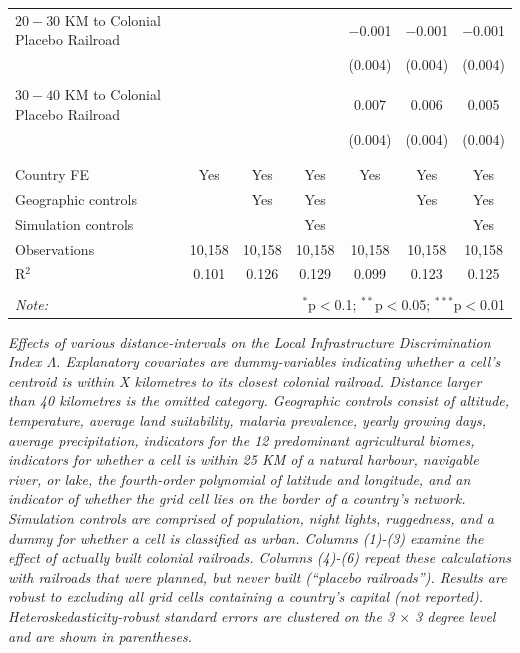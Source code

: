 \documentclass[11pt, oneside]{article}   	%
\newcommand{\mysubcaption}[1]{
\justify
\begin{spacing}{0.7}
\textit{\footnotesize #1}
\end{spacing}}
\begin{document}
\begin{table}[!ph]
{\begin{tabular}{@{\extracolsep{5pt}}lcccccc}
   $20-30$ KM to Colonial Placebo Railroad &  &  &  & $-$0.001 & $-$0.001 & $-$0.001   \\
  &  &  &  & (0.004) & (0.004) & (0.004)  \\
    & & & & & &   \\
   $30-40$ KM to Colonial Placebo Railroad &  &  &  & 0.007 & 0.006 & 0.005   \\
  &  &  &  & (0.004) & (0.004) & (0.004)   \\
    & & & & & &  \\
  \hline \\[-1.8ex]
  Country FE & Yes & Yes & Yes & Yes & Yes & Yes \\
  Geographic controls &  & Yes & Yes &  & Yes & Yes  \\
  Simulation controls &  &  & Yes &  &  & Yes   \\
  Observations & 10,158 & 10,158 & 10,158 & 10,158 & 10,158 & 10,158   \\
  R$^{2}$ & 0.101 & 0.126 & 0.129 & 0.099 & 0.123 & 0.125   \\
  \hline
  \hline \\[-1.8ex]
  \textit{Note:}  & \multicolumn{6}{r}{$^{*}$p$<$0.1; $^{**}$p$<$0.05; $^{***}$p$<$0.01} \\
  \end{tabular}

}

\mysubcaption{Effects of various distance-intervals on the Local Infrastructure Discrimination Index $\Lambda$. Explanatory covariates are dummy-variables indicating whether a cell's centroid is within X kilometres to its closest colonial railroad. Distance larger than 40 kilometres is the omitted category. Geographic controls consist of altitude, temperature, average land suitability, malaria prevalence, yearly growing days, average precipitation, indicators for the 12 predominant agricultural biomes, indicators for whether a cell is within 25 KM of a natural harbour, navigable river, or lake, the fourth-order polynomial of latitude and longitude, and an indicator of whether the grid cell lies on the border of a country's network. Simulation controls are comprised of population, night lights, ruggedness, and a dummy for whether a cell is classified as urban. Columns (1)-(3) examine the effect of actually built colonial railroads. Columns (4)-(6) repeat these calculations with railroads that were planned, but never built (``placebo railroads''). Results are robust to excluding all grid cells containing a country's capital (not reported). Heteroskedasticity-robust standard errors are clustered on the 3 $\times$ 3 degree level and are shown in parentheses.}
\end{table}
\end{document}
